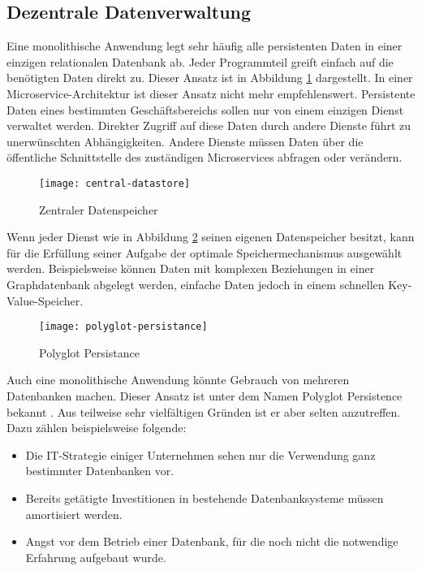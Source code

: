 \subsection{Dezentrale Datenverwaltung}

Eine monolithische Anwendung legt sehr häufig alle persistenten Daten in einer einzigen relationalen Datenbank ab. Jeder Programmteil greift einfach auf die benötigten Daten direkt zu. Dieser Ansatz ist in Abbildung \ref{fig:central-datastore} dargestellt. In einer Microservice-Architektur ist dieser Ansatz nicht mehr empfehlenswert. Persistente Daten eines bestimmten Geschäftsbereichs sollen nur von einem einzigen Dienst verwaltet werden. Direkter Zugriff auf diese Daten durch andere Dienste führt zu unerwünschten Abhängigkeiten. Andere Dienste müssen Daten über die öffentliche Schnittstelle des zuständigen Microservices abfragen oder verändern.

\begin{figure}[h]
  \centering
	\texttt{[image: central-datastore]}
	\caption{Zentraler Datenspeicher}
	\label{fig:central-datastore}
\end{figure}

Wenn jeder Dienst wie in Abbildung \ref{fig:polyglot-persistnace} seinen eigenen Datenspeicher besitzt, kann für die Erfüllung seiner Aufgabe der optimale Speichermechanismus ausgewählt werden. Beispielsweise können Daten mit komplexen Beziehungen in einer Graphdatenbank abgelegt werden, einfache Daten jedoch in einem schnellen Key-Value-Speicher.

\begin{figure}[h]
  \centering
	\texttt{[image: polyglot-persistance]}
	\caption{Polyglot Persistance}
	\label{fig:polyglot-persistnace}
\end{figure}

Auch eine monolithische Anwendung könnte Gebrauch von mehreren Datenbanken machen. Dieser Ansatz ist unter dem Namen Polyglot Persistence bekannt \cite{FowlerPP}. Aus teilweise sehr vielfältigen Gründen ist er aber selten anzutreffen. Dazu zählen beispielsweise folgende:

\begin{itemize}
  \item Die IT-Strategie einiger Unternehmen sehen nur die Verwendung ganz bestimmter Datenbanken vor.
	\item Bereits getätigte Investitionen in bestehende Datenbanksysteme müssen amortisiert werden.
	\item Angst vor dem Betrieb einer Datenbank, für die noch nicht die notwendige Erfahrung aufgebaut wurde.
\end{itemize}

